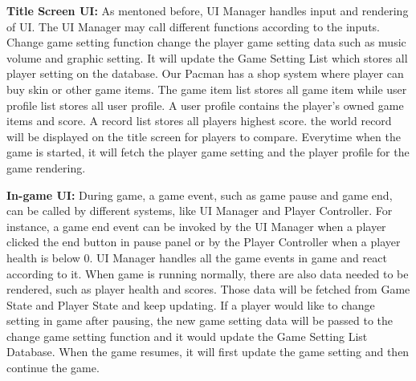 \documentclass[11pt]{article}
\begin{document}
\textbf{Title Screen UI:} As mentoned before, UI Manager handles input and rendering of UI. The UI Manager may call different functions according to the inputs. Change game setting function change the player game setting data such as music volume and graphic setting. It will update the Game Setting List which stores all player setting on the database. Our Pacman has a shop system where player can buy skin or other game items. The game item list stores all game item while user profile list stores all user profile. A user profile contains the player's owned game items and score. A record list stores all players highest score. the world record will be displayed on the title screen for players to compare. Everytime when the game is started, it will fetch the player game setting and the player profile for the game rendering.

\textbf{In-game UI:} During game, a game event, such as game pause and game end, can be called by different systems, like UI Manager and Player Controller. For instance, a game end event can be invoked by the UI Manager when a player clicked the end button in pause panel or by the Player Controller when a player health is below 0. UI Manager handles all the game events in game and react according to it. When game is running normally, there are also data needed to be rendered, such as player health and scores. Those data will be fetched from Game State and Player State and keep updating. If a player would like to change setting in game after pausing, the new game setting data will be passed to the change game setting function and it would update the Game Setting List Database. When the game resumes, it will first update the game setting and then continue the game.
\end{document}
